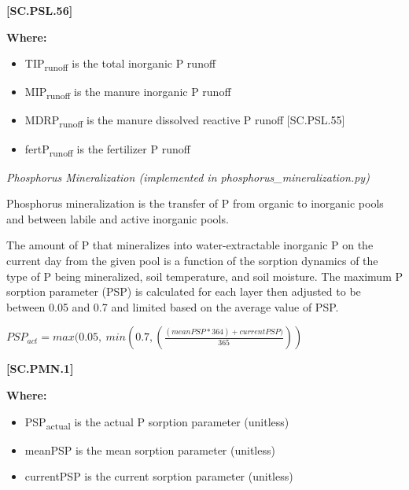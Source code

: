             {\raggedleft \textbf{[SC.PSL.56]}\par}
            \vspace{0.5cm}

        \textbf{Where:}
            
        \begin{itemize}
            \item TIP\textsubscript{runoff} is the total inorganic P runoff
            \item MIP\textsubscript{runoff} is the manure inorganic P runoff
            \item MDRP\textsubscript{runoff} is the manure dissolved reactive P runoff [SC.PSL.55]
            \item fertP\textsubscript{runoff} is the fertilizer P runoff
        \end{itemize}
        \vspace{0.5cm}


\textit{Phosphorus Mineralization (implemented in phosphorus\_mineralization.py)}
\vspace{0.2cm}

Phosphorus mineralization is the transfer of P from organic to inorganic pools and between labile and active inorganic pools.
\vspace{0.2cm}

The amount of P that mineralizes into water-extractable inorganic P on the current day from the given pool is a function of the sorption dynamics of the type of P being mineralized, soil temperature, and soil moisture. The maximum P sorption parameter (PSP) is calculated for each layer then adjusted to be between 0.05 and 0.7 and limited based on the average value of PSP.
            \vspace{0.5cm}

    \begin{center}
\(PSP_{act}= max(0.05,\ min(0.7,( \frac{(meanPSP*364)+currentPSP)}{365}))\)
    \end{center}
        \vspace{0.5cm} 
    
            {\raggedleft \textbf{[SC.PMN.1]}\par}
            \vspace{0.5cm}

        \textbf{Where:}
            
        \begin{itemize}
            \item PSP\textsubscript{actual} is the actual P sorption parameter (unitless)
            \item meanPSP is the mean sorption parameter (unitless)
            \item currentPSP is the current sorption parameter	(unitless)
        \end{itemize}
        \vspace{0.5cm}

